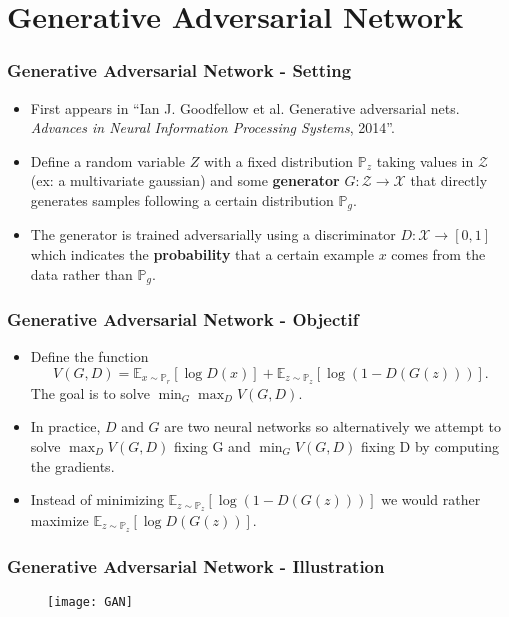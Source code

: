 \section{Generative Adversarial Network}

\begin{frame}
  \frametitle{Generative Adversarial Network - Setting}
  \begin{itemize}
    \item First appears in 
      ``Ian J. Goodfellow et al. Generative adversarial nets. \textit{Advances
      in Neural Information Processing Systems}, 2014''.
    \item Define a random variable $Z$ with a fixed distribution $\mathbb{P}_z$
      taking values in $\mathcal{Z}$ (ex: a multivariate gaussian) and some
      \textbf{generator} $G: \mathcal{Z} \rightarrow \mathcal{X}$ that
      directly generates samples following a certain distribution
      $\mathbb{P}_g$.
    \item The generator is trained adversarially using a discriminator
      $D: \mathcal{X} \rightarrow [0, 1]$ which indicates the
      \textbf{probability} that
      a certain example $x$ comes from the data rather than $\mathbb{P}_g$.
  \end{itemize}
\end{frame}

\begin{frame}
  \frametitle{Generative Adversarial Network - Objectif}
  \begin{itemize}
    \item Define the function
      \[ 
        V(G, D)
        = \mathbb{E}_{x\sim\mathbb{P}_r}[\log D(x)]
        + \mathbb{E}_{z\sim\mathbb{P}_z}[\log(1-D(G(z)))].
      \]
      The goal is to solve $\min_G\max_D V(G, D)$.
    \item In practice, $D$ and $G$ are two neural networks so alternatively
      we attempt to solve $\max_D V(G, D)$ fixing G and $\min_G V(G, D)$ fixing
      D by computing the gradients.
    \item Instead of minimizing
      $\mathbb{E}_{z\sim\mathbb{P}_z}[\log(1-D(G(z)))]$
      we would rather maximize $\mathbb{E}_{z\sim\mathbb{P}_z}[\log D(G(z))]$.
  \end{itemize}
\end{frame}

\begin{frame}
  \frametitle{Generative Adversarial Network - Illustration}
    \begin{figure}
      \texttt{[image: GAN]}
    \end{figure}
\end{frame}

